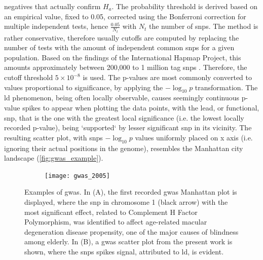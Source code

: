 negatives that actually confirm $H_a$. The probability threshold is derived based on an empirical value, fixed to 0.05, corrected using the Bonferroni correction for multiple independent tests, hence $\frac{0.05}{N_t}$ with $N_t$ the number of \acp{snp}. The method is rather conservative, therefore usually cutoffs are computed by replacing the number of tests with the amount of independent common \acp{snp} for a given population. Based on the findings of the International Hapmap Project, this amounts approximately between 200,000 to 1 million tag \acp{snp} \cite{Belmont2003}. Therefore, the cutoff threshold $5\times 10 ^ {-8}$ is used. The p-values are most commonly converted to values proportional to significance, by applying the $-\log_{10}{p}$ transformation.   The \ac{ld} phenomenon, being often locally observable, causes seemingly continuous p-value spikes to appear when plotting the data points, with the lead, or functional, \ac{snp}, that is the one with the greatest local significance (i.e. the lowest locally recorded p-value), being `supported` by lesser significant \ac{snp} in its vicinity. The resulting scatter plot, with \acp{snp} $-\log_{10}{p}$ values uniformly placed on x axis (i.e. ignoring their actual positions in the genome), resembles the Manhattan city landscape (\autoref{fig:gwas_example}).

 \begin{figure}[H]
 	\begin{subfigure}[t]{0.45\textwidth}
	\centering
	\texttt{[image: gwas\_2005]}
	\caption{}
	\label{fig:gwas_2005}
	\end{subfigure}
	\hfill
	\begin{subfigure}[t]{0.6\textwidth}
		\centering
		
		\caption{}
		\label{fig:gwas_example}
	\end{subfigure}
	\caption[Examples of \acs{gwas} Manhattan plots \cite{Klein2005}]{Examples of \ac{gwas}. In (A), the first recorded \ac{gwas} Manhattan plot \cite{Klein2005} is displayed, where the \ac{snp} in chromosome 1 (black arrow) with the most significant  effect, related to Complement H Factor Polymorphism, was identified to affect age-related macular degeneration disease propensity, one of the major causes of blindness among elderly. In (B), a \ac{gwas} scatter plot from the present work is shown, where the \acp{snp} spikes signal, attributed to \ac{ld}, is evident.}
\end{figure}

